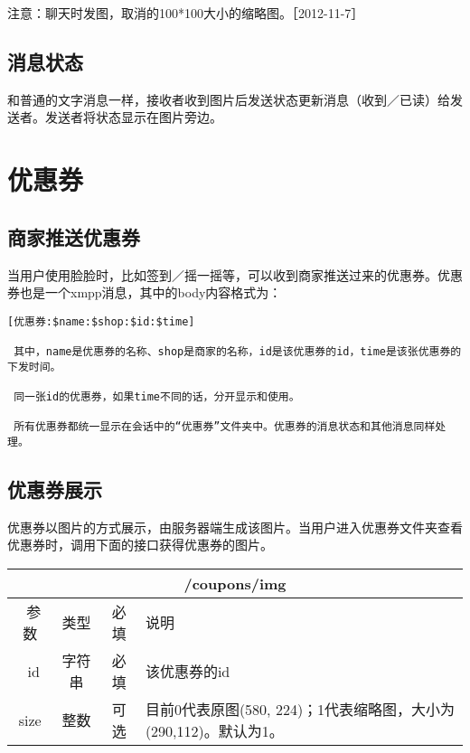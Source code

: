 \documentclass[cs4size]{ctexartutf8}
\begin{document}
注意：聊天时发图，取消的100*100大小的缩略图。［2012-11-7］


\subsection{消息状态}
和普通的文字消息一样，接收者收到图片后发送状态更新消息（收到／已读）给发送者。发送者将状态显示在图片旁边。






\section{优惠券}

\subsection{商家推送优惠券}
当用户使用脸脸时，比如签到／摇一摇等，可以收到商家推送过来的优惠券。优惠券也是一个xmpp消息，其中的body内容格式为：

\begin{verbatim}
[优惠券:$name:$shop:$id:$time]

 其中，name是优惠券的名称、shop是商家的名称，id是该优惠券的id，time是该张优惠券的下发时间。
 
 同一张id的优惠券，如果time不同的话，分开显示和使用。
 
 所有优惠券都统一显示在会话中的“优惠券”文件夹中。优惠券的消息状态和其他消息同样处理。
\end{verbatim}

\subsection{优惠券展示}
优惠券以图片的方式展示，由服务器端生成该图片。当用户进入优惠券文件夹查看优惠券时，调用下面的接口获得优惠券的图片。

\begin{table}[H]
   \begin{center}
\begin{tabular}{|c|c|c|p{12cm}|}
\hline
\multicolumn{4}{|c|}{/coupons/img} \\
\hline\hline
 \  参数  & 类型 & 必填 &  说明  \\
\hline
 \  id  & 字符串 & 必填 &  该优惠券的id  \\
\hline
 size  & 整数 & 可选 &  目前0代表原图(580, 224)；1代表缩略图，大小为(290,112)。默认为1。\\ 
\hline
\end{tabular}
   \end{center}
\end{table}
\end{document}
